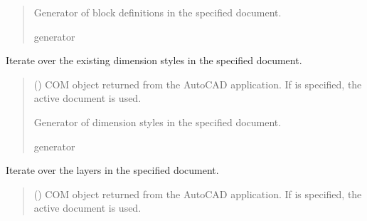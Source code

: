 \documentclass[a4paper,10pt,english]{sphinxmanual}
\begin{document}
\begin{fulllineitems}
\begin{fulllineitems}
\begin{quote}
\begin{description}
\sphinxAtStartPar
Generator of block definitions in the specified document.

\sphinxAtStartPar
generator

\end{description}\end{quote}

\end{fulllineitems}


\begin{fulllineitems}
\label{\detokenize{API:pyacad.Autocad.Autocad.iter_dim_styles}}
\pysigstartsignatures
{}
\pysigstopsignatures
\sphinxAtStartPar
Iterate over the existing dimension styles in the specified document.
\begin{quote}\begin{description}
\sphinxAtStartPar
{} (\sphinxstyleliteralemphasis{\sphinxupquote{, }}) \textendash{} COM object returned from the AutoCAD application. If  is specified,
the active document is used.

\sphinxAtStartPar
Generator of dimension styles in the specified document.

\sphinxAtStartPar
generator

\end{description}\end{quote}

\end{fulllineitems}


\begin{fulllineitems}
\label{\detokenize{API:pyacad.Autocad.Autocad.iter_layers}}
\pysigstartsignatures
{}
\pysigstopsignatures
\sphinxAtStartPar
Iterate over the layers in the specified document.
\begin{quote}\begin{description}
\sphinxAtStartPar
{} (\sphinxstyleliteralemphasis{\sphinxupquote{, }}) \textendash{} COM object returned from the AutoCAD application. If  is specified,
the active document is used.


\end{description}
\end{quote}
\end{fulllineitems}
\end{fulllineitems}
\end{document}
